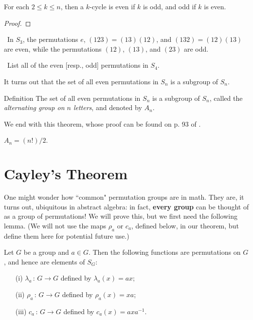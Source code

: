 \begin{lem}\label{evenodd} For each $2\leq k\leq n$, then a $k$-cycle is even if $k$ is odd, and odd if $k$ is even.
\end{lem}

\begin{proof} \end{proof}

\begin{example}{}\
In $S_3$, the permutations $e$, $(123)=(13)(12)$, and $(132)=(12)(13)$ are even, while the permutations $(12)$, $(13)$, and $(23)$ are odd.
\end{example}

\begin{example}{}\
List all of the even [resp., odd] permutations in $S_4$.
\end{example}

It turns out that the set of all even permutations in $S_n$ is a subgroup of $S_n$. 

\begin{df}{Definition} The set of all even permutations in $S_n$ is a subgroup of $S_n$,  called the \textit{alternating group on $n$ letters}, and denoted by $A_n$.
\end{df}

We end with this theorem, whose proof can be found on p. 93 of \cite{F}.

\begin{thm}\label{} $A_n=(n!)/2$.
\end{thm}

\section{Cayley's Theorem}

One might wonder how ``common" permutation groups are in math. They
are, it turns out, ubiquitous in abstract algebra: in fact, \textbf{every group} can be thought of as a group of permutations!  We will
prove this, but we first need the following lemma. (We will not use
the maps $\rho_a$ or $c_a$, defined below, in our theorem, but
define them here for potential future use.)

\begin{lem}\label{cay.lem} Let $G$ be a group and $a\in G$.  Then the
following functions are permutations on $G$, and hence are elements
of $S_G$:

\begin{enumerate}
\item[(i)] $\lambda_a\,:\,G\to G$ defined by $\lambda_a(x)=ax$;
\item[(ii)] $\rho_a\,:\,G\to G$ defined by $\rho_a(x)=xa$;

\item[(iii)] $c_a\,:\,G\to G$ defined by $c_a(x)=axa^{-1}$.
\end{enumerate}
\end{lem}

